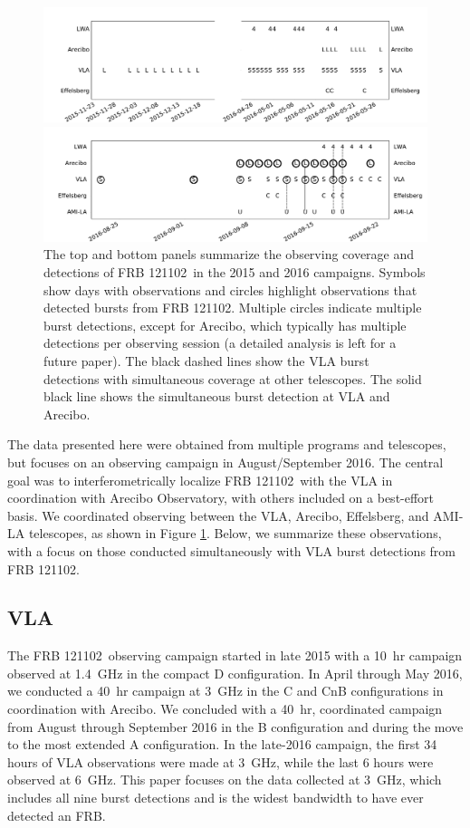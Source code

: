 \documentclass[twocolumn]{aastex61}
\newcommand{\frb}{FRB 121102}
\begin{document}
\begin{figure}[t]
\begin{center}
\includegraphics[width=2\columnwidth]{timeline0}

\includegraphics[width=2\columnwidth]{timeline}
\caption{The top and bottom panels summarize the observing coverage and detections of \frb\ in the 2015 and 2016 campaigns. Symbols show days with observations and circles highlight observations that detected bursts from \frb. Multiple circles indicate multiple burst detections, except for Arecibo, which typically has multiple detections per observing session (a detailed analysis is left for a future paper). The black dashed lines show the VLA burst detections with simultaneous coverage at other telescopes. The solid black line shows the simultaneous burst detection at VLA and Arecibo.
\label{fig:multi}}
\end{center}
\end{figure}

The data presented here were obtained from multiple programs and telescopes, but focuses on an observing campaign in August/September 2016. The central goal was to interferometrically localize \frb\ with the VLA in coordination with Arecibo Observatory, with others included on a best-effort basis. We coordinated observing between the VLA, Arecibo, Effelsberg, and AMI-LA telescopes, as shown in Figure \ref{fig:multi}. Below, we summarize these observations, with a focus on those conducted simultaneously with VLA burst detections from \frb.

\subsection{VLA}
The \frb\ observing campaign started in late 2015 with a 10~hr campaign observed at 1.4~GHz in the compact D configuration. In April through May 2016, we conducted a 40~hr campaign at 3~GHz in the C and CnB configurations in coordination with Arecibo. We concluded with a 40~hr, coordinated campaign from August through September 2016 in the B configuration and during the move to the most extended A configuration. In the late-2016 campaign, the first 34 hours of VLA observations were made at 3~GHz, while the last 6 hours were observed at 6~GHz. This paper focuses on the data collected at 3~GHz, which includes all nine burst detections and is the widest bandwidth to have ever detected an FRB.
\end{document}

